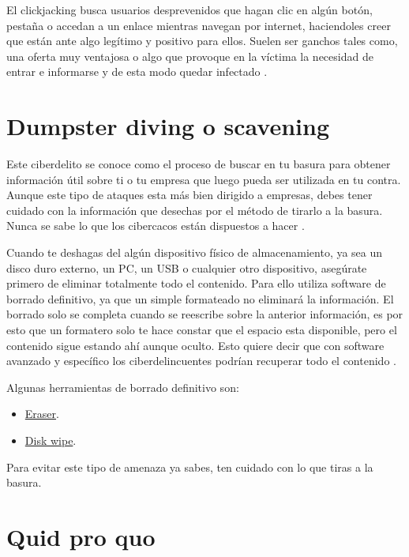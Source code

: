 \documentclass[
  spanish,
  a4paper,
  openany]{book}
\begin{document}
El clickjacking busca usuarios desprevenidos que hagan clic en algún botón, pestaña o accedan a un enlace mientras navegan por internet, haciendoles creer que están ante algo legítimo y positivo para ellos. Suelen ser ganchos tales como, una oferta muy ventajosa o algo que provoque en la víctima la necesidad de entrar e informarse y de esta modo quedar infectado \citep{WIKI-clickjacking}.

\hypertarget{dumpster-diving-o-scavening}{%
\section{Dumpster diving o scavening}\label{dumpster-diving-o-scavening}}

Este ciberdelito se conoce como el proceso de buscar en tu basura para obtener información útil sobre ti o tu empresa que luego pueda ser utilizada en tu contra. Aunque este tipo de ataques esta más bien dirigido a empresas, debes tener cuidado con la información que desechas por el método de tirarlo a la basura. Nunca se sabe lo que los cibercacos están dispuestos a hacer \citep{WIKI-dumpster-diving}.

Cuando te deshagas del algún dispositivo físico de almacenamiento, ya sea un disco duro externo, un PC, un USB o cualquier otro dispositivo, asegúrate primero de eliminar totalmente todo el contenido. Para ello utiliza software de borrado definitivo, ya que un simple formateado no eliminará la información. El borrado solo se completa cuando se reescribe sobre la anterior información, es por esto que un formatero solo te hace constar que el espacio esta disponible, pero el contenido sigue estando ahí aunque oculto. Esto quiere decir que con software avanzado y específico los ciberdelincuentes podrían recuperar todo el contenido \citep{XATAKA-borrado-almacenamiento}.

Algunas herramientas de borrado definitivo son:

\begin{itemize}
\item
  \href{https://eraser.heidi.ie/}{Eraser}.
\item
  \href{https://www.diskwipe.org/download.php}{Disk wipe}.
\end{itemize}

Para evitar este tipo de amenaza ya sabes, ten cuidado con lo que tiras a la basura.

\hypertarget{quid-pro-quo}{%
\section{Quid pro quo}\label{quid-pro-quo}}
\end{document}
